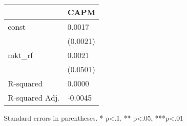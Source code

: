 \begin{table}
\caption{}
\label{}
\begin{center}
\begin{tabular}{ll}
\hline
               & CAPM      \\
\hline
const          & 0.0017    \\
               & (0.0021)  \\
mkt\_rf        & 0.0021    \\
               & (0.0501)  \\
R-squared      & 0.0000    \\
R-squared Adj. & -0.0045   \\
\hline
\end{tabular}
\end{center}
\end{table}
\bigskip
Standard errors in parentheses. \newline 
* p<.1, ** p<.05, ***p<.01